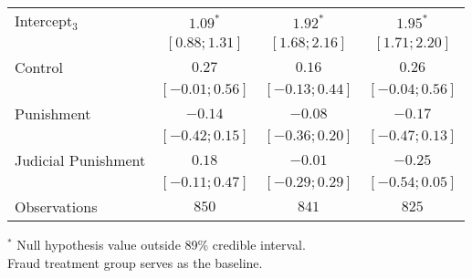 \begin{table}[h]
\begin{center}
\begin{threeparttable}
\begin{tabular}{l c c c}
Intercept$_3$       & $1.09^{*}$        & $1.92^{*}$        & $1.95^{*}$        \\
                    & $ [ 0.88;  1.31]$ & $ [ 1.68;  2.16]$ & $ [ 1.71;  2.20]$ \\
Control             & $0.27$            & $0.16$            & $0.26$            \\
                    & $ [-0.01;  0.56]$ & $ [-0.13;  0.44]$ & $ [-0.04;  0.56]$ \\
Punishment          & $-0.14$           & $-0.08$           & $-0.17$           \\
                    & $ [-0.42;  0.15]$ & $ [-0.36;  0.20]$ & $ [-0.47;  0.13]$ \\
Judicial Punishment & $0.18$            & $-0.01$           & $-0.25$           \\
                    & $ [-0.11;  0.47]$ & $ [-0.29;  0.29]$ & $ [-0.54;  0.05]$ \\
\hline
Observations        & $850$             & $841$             & $825$             \\
\hline
\end{tabular}
\begin{tablenotes}[flushleft]
\scriptsize{$^*$ Null hypothesis value outside 89\% credible interval.  \\
Fraud treatment group serves as the baseline.}
\end{tablenotes}
\end{threeparttable}
\label{table:coefficients}
\end{center}
\end{table}
